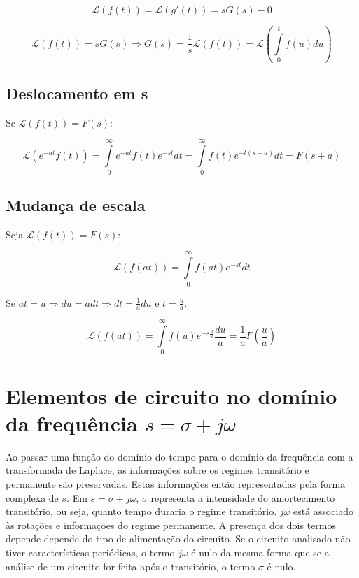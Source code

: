 \documentclass[12pt,fleqn]{book} %
\begin{document}
\begin{equation}
\mathscr{L}(f(t)) = \mathscr{L}(g'(t)) = sG(s)-0
\end{equation}
    
\begin{equation}
\mathscr{L}(f(t)) = sG(s) \Rightarrow G(s) = \frac{1}{s}\mathscr{L}(f(t)) = \mathscr{L}(\int\limits_{0}^{t}f(u)du)
\end{equation}    

\subsection{Deslocamento em s}

Se $\mathscr{L}(f(t)) = F(s)$:

\begin{equation}
\mathscr{L}(e^{-at}f(t)) = \int\limits_{0}^{\infty}e^{-at}f(t)e^{-st}dt = \int\limits_{0}^{\infty}f(t)e^{-t(s+a)}dt = F(s+a)
\end{equation}

\subsection{Mudança de escala}

Seja $\mathscr{L}(f(t)) = F(s)$:

\begin{equation}
\mathscr{L}(f(at)) = \int\limits_{0}^{\infty}f(at)e^{-st}dt
\end{equation}

Se $at = u \Rightarrow du = adt \Rightarrow dt = \frac{1}{a}du$ e $t = \frac{u}{a}$.

\begin{equation}
\mathscr{L}(f(at)) = \int\limits_{0}^{\infty}f(u)e^{-s\frac{u}{a}}\frac{du}{a} = \frac{1}{a}F(\frac{u}{a})
\end{equation}
    
    \section{Elementos de circuito no domínio da frequência {$s = \sigma + j\omega$}}
    
    Ao passar uma função do domínio do tempo para o domínio da frequência com a transformada de Laplace, as informações sobre os regimes transitório e permanente são preservadas. Estas informações então representadas pela forma complexa de $s$. Em $s = \sigma + j\omega$, $\sigma$ representa a intensidade do amortecimento transitório, ou seja, quanto tempo duraria o regime transitório. $j\omega$ está associado às rotações e informações do regime permanente. A presença dos dois termos depende depende do tipo de alimentação do circuito. Se o circuito analisado não tiver características periódicas, o termo $j\omega$ é nulo da mesma forma que se a análise de um circuito for feita após o transitório, o termo $\sigma$ é nulo.
\end{document}
